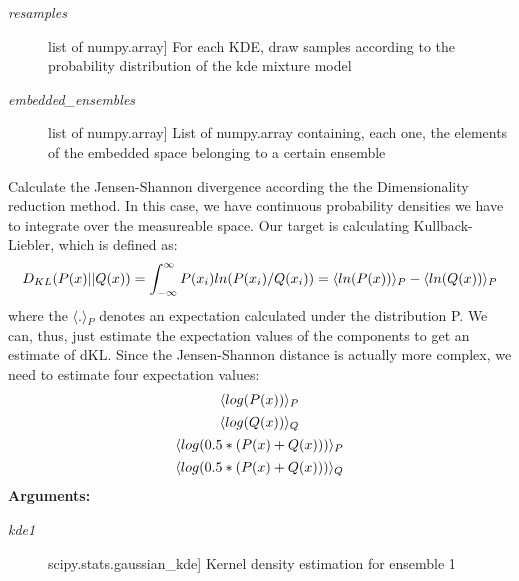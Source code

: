 \documentclass[letterpaper,10pt,english]{sphinxmanual}
\begin{document}
\begin{fulllineitems}
\begin{description}
\item[{\emph{resamples}}] \leavevmode{[}list of numpy.array{]}
For each KDE, draw samples according to the probability distribution of the kde mixture model

\item[{\emph{embedded\_ensembles}}] \leavevmode{[}list of numpy.array{]}
List of numpy.array containing, each one, the elements of the embedded space belonging to a certain ensemble

\end{description}

\end{fulllineitems}


\begin{fulllineitems}
\label{index:encore.similarity.dimred_ensemble_similarity}
Calculate the Jensen-Shannon divergence according the the Dimensionality reduction method. In this case, we have continuous probability densities we have to integrate over the measureable space. Our target is calculating Kullback-Liebler, which is defined as:
\begin{gather}
\begin{split}D_{KL}(P(x) || Q(x)) = \int_{-\infty}^{\infty}P(x_i) ln(P(x_i)/Q(x_i)) = \langle{}ln(P(x))\rangle{}_P - \langle{}ln(Q(x))\rangle{}_P\end{split}\notag
\end{gather}
where the \(\langle{}.\rangle{}_P\) denotes an expectation calculated under the 
distribution P. We can, thus, just estimate the expectation values of the components to get an estimate of dKL.
Since the Jensen-Shannon distance is actually  more complex, we need to estimate four expectation values:
\begin{gather}
\begin{split}\langle{}log(P(x))\rangle{}_P\end{split}\notag\\\begin{split}\langle{}log(Q(x))\rangle{}_Q\end{split}\notag\\\begin{split}\langle{}log(0.5*(P(x)+Q(x)))\rangle{}_P\end{split}\notag\\\begin{split}\langle{}log(0.5*(P(x)+Q(x)))\rangle{}_Q\end{split}\notag
\end{gather}
\textbf{Arguments:}
\begin{description}
\item[{\emph{kde1}}] \leavevmode{[}scipy.stats.gaussian\_kde{]}
Kernel density estimation for ensemble 1


\end{description}
\end{fulllineitems}
\end{document}
